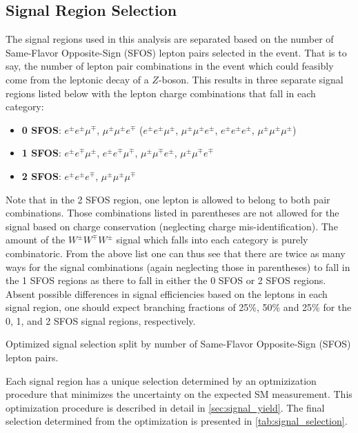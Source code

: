 \subsection{Signal Region Selection}
\label{sec:signal_regions}
The signal regions used in this analysis are separated based on the number of 
Same-Flavor Opposite-Sign (SFOS) lepton pairs selected in the event.  That is to say,
the number of lepton pair combinations in the event 
which could feasibly come from the leptonic decay of a $Z$-boson.
This results in three separate signal regions listed 
below with the lepton charge combinations
that fall in each category:
\begin{itemize}
\item \textbf{0 SFOS}: $e^{\pm}e^{\pm}\mu^{\mp}$, 
$\mu^{\pm}\mu^{\pm}e^{\mp}$ ($e^{\pm}e^{\pm}\mu^{\pm}$, 
$\mu^{\pm}\mu^{\pm}e^{\pm}$, $e^{\pm}e^{\pm}e^{\pm}$, $\mu^{\pm}\mu^{\pm}\mu^{\pm}$)
\item \textbf{1 SFOS}: $e^{\pm}e^{\mp}\mu^{\pm}$, 
$e^{\pm}e^{\mp}\mu^{\mp}$, $\mu^{\pm}\mu^{\mp}e^{\pm}$, $\mu^{\pm}\mu^{\mp}e^{\mp}$
\item \textbf{2 SFOS}: $e^{\pm}e^{\pm}e^{\mp}$, $\mu^{\pm}\mu^{\pm}\mu^{\mp}$
\end{itemize}
Note that in the 2 SFOS region, one lepton is allowed to belong to both 
pair combinations.
Those combinations listed in parentheses are not allowed for the signal based on charge conservation (neglecting charge mis-identification).  
The amount of the $W^{\pm}W^{\mp}W^{\pm}$ signal
which falls into each category is purely combinatoric.  
From the above list one can thus see that there are twice as many ways 
for the signal combinations (again neglecting those in parentheses)
to fall in the 1 SFOS regions as 
there to fall in either the 0 SFOS or 2 SFOS regions. 
Absent possible differences in signal efficiencies based on the leptons in each 
signal region, one should expect branching 
fractions of 25\%, 50\% and 25\% for the 0, 1, and 2 SFOS signal regions, respectively.


\begin{table}[ht!]
\centering
\begin{small}

\end{small}
\caption{Optimized signal selection split by number of Same-Flavor 
Opposite-Sign (SFOS) lepton pairs.}
\label{tab:signal_selection}
\end{table}

Each signal region has a unique selection determined by an optmizization
procedure that minimizes the uncertainty on the expected SM measurement. 
This optimization procedure is described in detail in \sec\ref{sec:signal_yield}.
The final selection determined from the optimization
is presented in \tab\ref{tab:signal_selection}.






